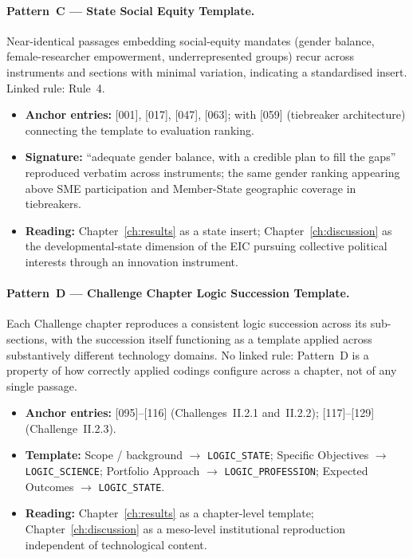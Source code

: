 \paragraph{Pattern~C --- State Social Equity Template.}
Near-identical passages embedding social-equity mandates (gender
balance, female-researcher empowerment, underrepresented groups) recur
across instruments and sections with minimal variation, indicating a
standardised insert. Linked rule: Rule~4.

\begin{itemize}[leftmargin=*]
  \item \textbf{Anchor entries:} [001], [017], [047], [063]; with
    [059] (tiebreaker architecture) connecting the template to
    evaluation ranking.
  \item \textbf{Signature:} \enquote{adequate gender balance, with a
    credible plan to fill the gaps} reproduced verbatim across
    instruments; the same gender ranking appearing above SME
    participation and Member-State geographic coverage in tiebreakers.
  \item \textbf{Reading:} Chapter~\ref{ch:results} as a state insert;
    Chapter~\ref{ch:discussion} as the developmental-state dimension
    of the EIC pursuing collective political interests through an
    innovation instrument.
\end{itemize}

\paragraph{Pattern~D --- Challenge Chapter Logic Succession Template.}
Each Challenge chapter reproduces a consistent logic succession across
its sub-sections, with the succession itself functioning as a template
applied across substantively different technology domains. No linked
rule: Pattern~D is a property of how correctly applied codings
configure across a chapter, not of any single passage.

\begin{itemize}[leftmargin=*]
  \item \textbf{Anchor entries:} [095]--[116] (Challenges~II.2.1
    and~II.2.2); [117]--[129] (Challenge~II.2.3).
  \item \textbf{Template:} Scope / background $\rightarrow$
    \texttt{LOGIC\_STATE}; Specific Objectives $\rightarrow$
    \texttt{LOGIC\_SCIENCE}; Portfolio Approach $\rightarrow$
    \texttt{LOGIC\_PROFESSION}; Expected Outcomes $\rightarrow$
    \texttt{LOGIC\_STATE}.
  \item \textbf{Reading:} Chapter~\ref{ch:results} as a chapter-level
    template; Chapter~\ref{ch:discussion} as a meso-level
    institutional reproduction independent of technological content.
\end{itemize}

